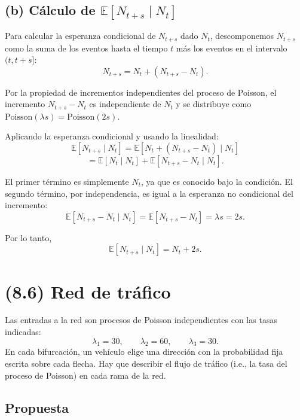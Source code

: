 \documentclass{article}
\begin{document}
\subsection*{(b) Cálculo de \( \mathbb{E}[N_{t+s} \mid N_t] \)}

Para calcular la esperanza condicional de \(N_{t+s}\) dado \(N_t\), descomponemos \(N_{t+s}\) como la suma de los eventos hasta el tiempo \(t\) más los eventos en el intervalo \((t, t+s]\):
\[
N_{t+s} = N_t + (N_{t+s} - N_t).
\]

Por la propiedad de incrementos independientes del proceso de Poisson, el incremento \(N_{t+s} - N_t\) es independiente de \(N_t\) y se distribuye como \(\text{Poisson}(\lambda s) = \text{Poisson}(2s)\).

Aplicando la esperanza condicional y usando la linealidad:
\[
\mathbb{E}[N_{t+s} \mid N_t] = \mathbb{E}[N_t + (N_{t+s} - N_t) \mid N_t]
\]
\[
= \mathbb{E}[N_t \mid N_t] + \mathbb{E}[N_{t+s} - N_t \mid N_t].
\]

El primer término es simplemente \(N_t\), ya que es conocido bajo la condición. El segundo término, por independencia, es igual a la esperanza no condicional del incremento:
\[
\mathbb{E}[N_{t+s} - N_t \mid N_t] = \mathbb{E}[N_{t+s} - N_t] = \lambda s = 2s.
\]

Por lo tanto,
\[
\mathbb{E}[N_{t+s} \mid N_t] = N_t + 2s.
\]

\newpage

\section*{(8.6) Red de tráfico}

Las entradas a la red son procesos de Poisson independientes con las tasas indicadas:
\[
\lambda_1 = 30,\qquad \lambda_2 = 60,\qquad \lambda_3 = 30.
\]
En cada bifurcación, un vehículo elige una dirección con la probabilidad fija escrita sobre cada flecha. Hay que describir el flujo de tráfico (i.e., la tasa del proceso de Poisson) en cada rama de la red.

\subsection*{Propuesta}
\end{document}
